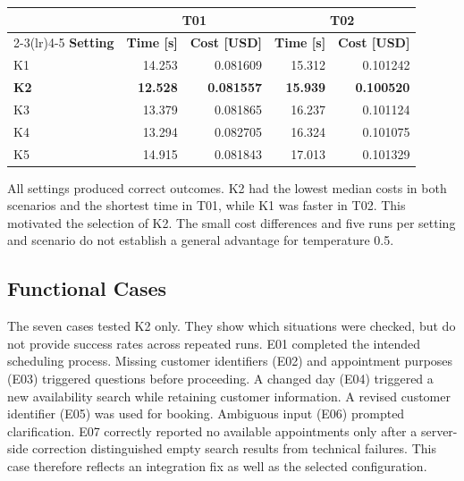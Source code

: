 \par\medskip
\noindent\begin{minipage}{\columnwidth}
    \label{tab:haiku-settings}
    \centering\small
    \renewcommand{\arraystretch}{1.12}
    \setlength{\tabcolsep}{3pt}
    \begin{tabular*}{\linewidth}{@{\extracolsep{\fill}}lrrrr@{}}
        \toprule
        & \multicolumn{2}{c}{\textbf{T01}} & \multicolumn{2}{c}{\textbf{T02}} \\
        \cmidrule(lr){2-3}\cmidrule(lr){4-5}
        \textbf{Setting} & \textbf{Time [s]} & \textbf{Cost [USD]} & \textbf{Time [s]} & \textbf{Cost [USD]} \\
        \midrule
        K1 & 14.253 & 0.081609 & 15.312 & 0.101242 \\
        \textbf{K2} & \textbf{12.528} & \textbf{0.081557} & \textbf{15.939} & \textbf{0.100520} \\
        K3 & 13.379 & 0.081865 & 16.237 & 0.101124 \\
        K4 & 13.294 & 0.082705 & 16.324 & 0.101075 \\
        K5 & 14.915 & 0.081843 & 17.013 & 0.101329 \\
        \bottomrule
    \end{tabular*}
\end{minipage}
\par\medskip

All settings produced correct outcomes.
K2 had the lowest median costs in both scenarios and the shortest time in T01, while K1 was faster in T02.
This motivated the selection of K2.
The small cost differences and five runs per setting and scenario do not establish a general advantage for temperature 0.5.

\subsection{Functional Cases}
The seven cases tested K2 only.
They show which situations were checked, but do not provide success rates across repeated runs.
E01 completed the intended scheduling process.
Missing customer identifiers (E02) and appointment purposes (E03) triggered questions before proceeding.
A changed day (E04) triggered a new availability search while retaining customer information.
A revised customer identifier (E05) was used for booking.
Ambiguous input (E06) prompted clarification.
E07 correctly reported no available appointments only after a server-side correction distinguished empty search results from technical failures.
This case therefore reflects an integration fix as well as the selected configuration.

